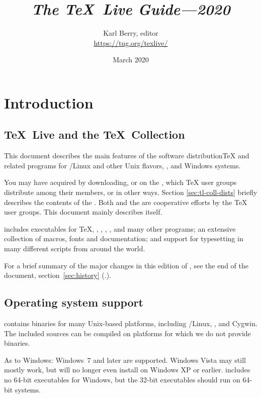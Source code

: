 \documentclass{article}
\title{%
  {\huge \textit{The \TeX\ Live Guide---2020}}
}
\author{Karl Berry, editor \\[3mm]
        \url{https://tug.org/texlive/}
       }
\date{March 2020}
\begin{document}
\maketitle

\begin{multicols}{2}
\tableofcontents
\end{multicols}

\section{Introduction}
\label{sec:intro}

\subsection{\protect\TeX\protect\ Live and the \protect\TeX\protect\ Collection}

This document describes the main features of the \TL{} software
distribution\Dash \TeX{} and related programs for \GNU/Linux
and other Unix flavors, \MacOSX, and Windows systems.

You may have acquired \TL{} by downloading, or on the \TK{} \DVD, which
\TeX{} user groups distribute among their members, or in other ways.
Section \ref{sec:tl-coll-dists} briefly describes the contents of the
\DVD.  Both \TL{} and the \TK{} are cooperative efforts by the \TeX{}
user groups. This document mainly describes \TL{} itself.

\TL{} includes executables for \TeX{}, \LaTeXe{}, \ConTeXt,
\MF, \MP, \BibTeX{} and many other programs; an extensive collection
of macros, fonts and documentation; and support for typesetting in
many different scripts from around the world.

For a brief summary of the major changes in this edition of \TL{},
see the end of the document, section~\ref{sec:history}
(\p.\pageref{sec:history}).


\subsection{Operating system support}
\label{sec:os-support}

\TL{} contains binaries for many Unix-based platforms, including
\GNU/Linux, \MacOSX, and Cygwin.  The included sources can be compiled
on platforms for which we do not provide binaries.

As to Windows: Windows~7 and later are supported. Windows Vista
may still mostly work, but \TL{} will no longer even install on Windows
XP or earlier.  \TL{} includes no
64-bit executables for Windows, but the 32-bit executables should
run on 64-bit systems.
\end{document}
